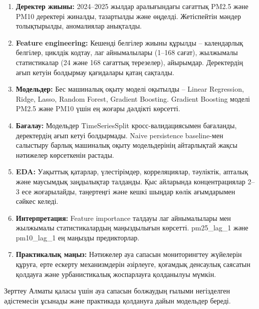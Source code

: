 \documentclass[12pt,a4paper]{article}
\begin{document}
\begin{enumerate}
\item \textbf{Деректер жиыны:} 2024–2025 жылдар аралығындағы сағаттық PM2.5 және PM10 деректері жиналды, тазартылды және өңделді. Жетіспейтін мәндер толықтырылды, аномалиялар анықталды.

\item \textbf{Feature engineering:} Кешенді белгілер жиыны құрылды – календарлық белгілер, циклдік кодтау, лаг айнымалылары (1–168 сағат), жылжымалы статистикалар (24 және 168 сағаттық терезелер), айырымдар. Деректердің ағып кетуін болдырмау қағидалары қатаң сақталды.

\item \textbf{Модельдер:} Бес машиналық оқыту моделі оқытылды – Linear Regression, Ridge, Lasso, Random Forest, Gradient Boosting. Gradient Boosting моделі PM2.5 және PM10 үшін ең жоғары дәлдікті көрсетті.

\item \textbf{Бағалау:} Модельдер TimeSeriesSplit кросс-валидациясымен бағаланды, деректердің ағып кетуі болдырмады. Naive persistence baseline-мен салыстыру барлық машиналық оқыту модельдерінің айтарлықтай жақсы нәтижелер көрсеткенін растады.

\item \textbf{EDA:} Уақыттық қатарлар, үлестірімдер, корреляциялар, тәуліктік, апталық және маусымдық заңдылықтар талданды. Қыс айларында концентрациялар 2–3 есе жоғарылайды, таңертеңгі және кешкі шыңдар көлік ағымдарымен сәйкес келеді.

\item \textbf{Интерпретация:} Feature importance талдауы лаг айнымалылары мен жылжымалы статистикалардың маңыздылығын көрсетті. pm25\_lag\_1 және pm10\_lag\_1 ең маңызды предикторлар.

\item \textbf{Практикалық маңыз:} Нәтижелер ауа сапасын мониторингтеу жүйелерін құруға, ерте ескерту механизмдерін әзірлеуге, қоғамдық денсаулық саясатын қолдауға және урбанистикалық жоспарлауға қолданылуы мүмкін.
\end{enumerate}

Зерттеу Алматы қаласы үшін ауа сапасын болжаудың ғылыми негізделген әдістемесін ұсынады және практикада қолдануға дайын модельдер береді.

\newpage
\end{document}
